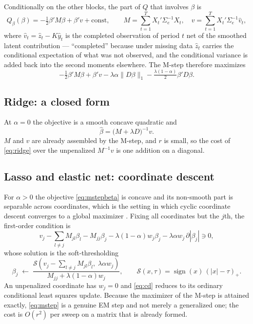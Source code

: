 \documentclass[11pt,a4paper]{article}
\DeclareMathOperator{\sgn}{sign}
\newcommand{\Sig}{\Sigma}
\newcommand{\Se}{\Sig_{e}}
\begin{document}
Conditionally on the other blocks, the part of $Q$ that involves $\beta$ is
\begin{equation}
  Q_\beta(\beta) = -\tfrac{1}{2}\beta' M \beta + \beta' v + \mathrm{const},
  \qquad
  M = \sum_{t=1}^{T} X_t'\Se^{-1}X_t,
  \quad
  v = \sum_{t=1}^{T} X_t'\Se^{-1}\hat v_t,
  \label{eq:Mv}
\end{equation}
where $\hat v_t = \hat z_t - K\hat y_t$ is the completed observation of period
$t$ net of the smoothed latent contribution --- ``completed'' because under
missing data $\hat z_t$ carries the conditional expectation of what was not
observed, and the conditional variance is added back into the second moments
elsewhere. The M-step therefore maximizes
\begin{equation}
  -\tfrac{1}{2}\beta'M\beta + \beta'v
  - \lambda\alpha\lVert D\beta\rVert_1
  - \tfrac{\lambda(1-\alpha)}{2}\beta'D\beta.
  \label{eq:mstepbeta}
\end{equation}

\subsection{Ridge: a closed form}

At $\alpha = 0$ the objective is a smooth concave quadratic and
\begin{equation}
  \hat\beta = \bigl( M + \lambda D \bigr)^{-1} v.
  \label{eq:ridge}
\end{equation}
$M$ and $v$ are already assembled by the M-step, and $r$ is small, so the cost
of \eqref{eq:ridge} over the unpenalized $M^{-1}v$ is one addition on a
diagonal.

\subsection{Lasso and elastic net: coordinate descent}

For $\alpha > 0$ the objective \eqref{eq:mstepbeta} is concave and its
non-smooth part is separable across coordinates, which is the setting in which
cyclic coordinate descent converges to a global maximizer
\citep{Tseng2001,Friedman2010}. Fixing all coordinates but the $j$th, the
first-order condition is
\[
  v_j - \sum_{l \ne j} M_{jl}\beta_l - M_{jj}\beta_j
  - \lambda(1-\alpha)w_j\beta_j
  - \lambda\alpha w_j\,\partial|\beta_j| \ni 0,
\]
whose solution is the soft-thresholding
\begin{equation}
  \beta_j \;\leftarrow\;
  \frac{\mathcal{S}\!\left(v_j - \sum_{l\ne j}M_{jl}\beta_l,\;
        \lambda\alpha w_j\right)}
       {M_{jj} + \lambda(1-\alpha)w_j},
  \qquad
  \mathcal{S}(x,\tau) = \sgn(x)\,(|x|-\tau)_+ .
  \label{eq:cd}
\end{equation}
An unpenalized coordinate has $w_j = 0$ and \eqref{eq:cd} reduces to its
ordinary conditional least squares update. Because the maximizer of the M-step
is attained exactly, \eqref{eq:mstep} is a genuine EM step and not merely a
generalized one; the cost is $O(r^2)$ per sweep on a matrix that is already
formed.
\end{document}
